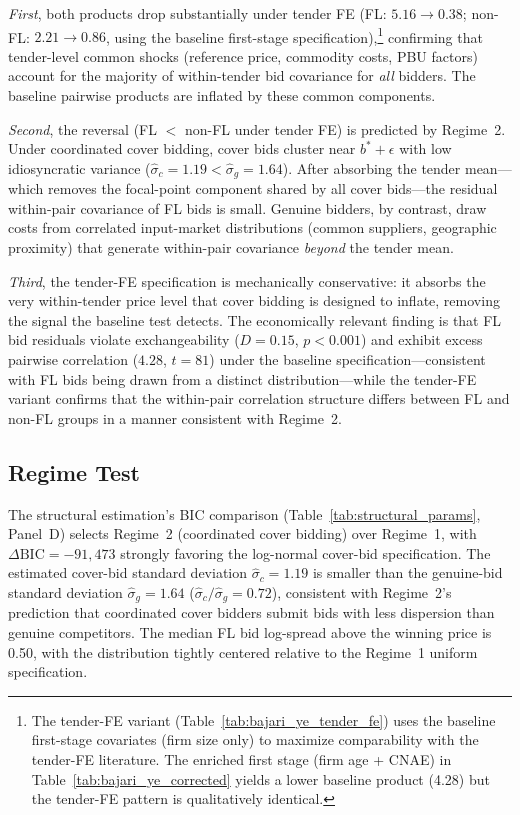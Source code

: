 \emph{First}, both products drop substantially under tender FE (FL: %
$5.16 \to 0.38$; non-FL: $2.21 \to 0.86$, using the baseline
first-stage specification),\footnote{The tender-FE variant
(Table~\ref{tab:bajari_ye_tender_fe}) uses the baseline first-stage
covariates (firm size only) to maximize comparability with the
tender-FE literature. The enriched first stage (firm age + CNAE)
in Table~\ref{tab:bajari_ye_corrected} yields a lower baseline
product (4.28) but the tender-FE pattern is qualitatively identical.}
confirming that
tender-level common shocks (reference price, commodity costs, PBU
factors) account for the majority of within-tender bid covariance for
\emph{all} bidders. The baseline pairwise products are inflated by
these common components.

\emph{Second}, the reversal (FL $<$ non-FL under tender FE) is
predicted by Regime~2. Under coordinated cover bidding, cover bids
cluster near $b^* + \epsilon$ with low idiosyncratic variance
($\hat{\sigma}_c = 1.19 < \hat{\sigma}_g = 1.64$). After absorbing
the tender mean---which removes the focal-point component shared by
all cover bids---the residual within-pair covariance of FL bids is
small. Genuine bidders, by contrast, draw costs from correlated
input-market distributions (common suppliers, geographic proximity)
that generate within-pair covariance \emph{beyond} the tender mean.

\emph{Third}, the tender-FE specification is mechanically
conservative: it absorbs the very within-tender price level that cover
bidding is designed to inflate, removing the signal the baseline test
detects. The economically relevant finding is that FL bid residuals
violate exchangeability ($D = 0.15$, $p < 0.001$) and exhibit
excess pairwise correlation ($4.28$, $t = 81$) under the baseline
specification---consistent with FL bids being drawn from a distinct
distribution---while the tender-FE variant confirms that the
within-pair correlation structure differs between FL and non-FL
groups in a manner consistent with Regime~2.


\subsection{Regime Test}
\label{sec:results_regime}

The structural estimation's BIC comparison (Table~\ref{tab:structural_params}, %
Panel~D) selects Regime~2 (coordinated cover bidding) over Regime~1,
with $\Delta\text{BIC} = -91{,}473$ strongly favoring the log-normal
cover-bid specification. The estimated cover-bid standard deviation
$\hat{\sigma}_c = 1.19$ is smaller than the genuine-bid standard
deviation $\hat{\sigma}_g = 1.64$ ($\hat{\sigma}_c / \hat{\sigma}_g =
0.72$), consistent with Regime~2's prediction that coordinated cover
bidders submit bids with less dispersion than genuine competitors.
The median FL bid log-spread above the winning price is 0.50,
with the distribution tightly centered relative to the Regime~1
uniform specification.


